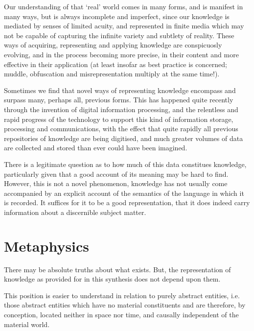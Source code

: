 Our understanding of that `real'%
world comes in many forms, and is manifest in many ways, but is always incomplete and imperfect, since our knowledge is mediated by senses of limited acuity, and represented in finite media which may not be capable of capturing the infinite variety and subtlety of reality.
These ways of acquiring, representing and applying knowledge are conspicuosly evolving, and in the process becoming more precise, in their content and more effective in their application (at least insofar as best practice is concerned; muddle, obfuscation and misrepresentation multiply at the same time!).

Sometimes we find that novel ways of representing knowledge encompass and surpass many, perhaps all, previous forms.
This has happened quite recently through the invention of digital information processing, and the relentless and rapid progress of the technology to support this kind of information storage, processing and communications, with the effect that quite rapidly all previous repositories of knowledge are being digitised, and much greater volumes of data are collected and stored than ever could have been imagined.

There is a legitimate question as to how much of this data constitues knowledge, particularly given that a good account of its meaning may be hard to find.
However, this is not a novel phenomenon, knowledge has not usually come accompanied by an explicit account of the semantics of the language in which it is recorded.
It suffices for it to be a good representation, that it does indeed carry information about a discernible subject matter.

\section{Metaphysics}

There may be absolute truths about what exists.
But, the representation of knowledge as provided for in this synthesis does not depend upon them.

This position is easier to understand in relation to purely abstract entities, i.e. those abstract entities which have no material constituents and are therefore, by conception, located neither in space nor time, and causally independent of the material world.


